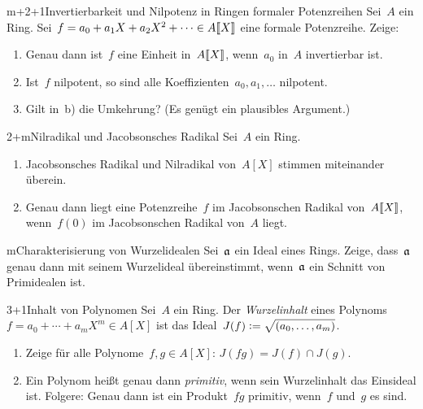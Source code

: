 \documentclass{uebblatt}
\begin{document}

\begin{aufgabe}{m+2+1}{Invertierbarkeit und Nilpotenz in Ringen formaler Potenzreihen}
Sei~$A$ ein Ring. Sei~$f = a_0 + a_1 X + a_2 X^2 + \cdots \in
{A}\llbracket{X}\rrbracket$ eine formale Potenzreihe. Zeige:
\begin{enumerate}
\item Genau dann ist~$f$ eine Einheit in~${A}\llbracket{X}\rrbracket$, wenn~$a_0$ in~$A$ invertierbar
ist.
\item Ist~$f$ nilpotent, so sind alle Koeffizienten~$a_0,a_1,\ldots$ nilpotent.
\item Gilt in~b) die Umkehrung? (Es genügt ein plausibles Argument.)
\end{enumerate}
\end{aufgabe}

\begin{aufgabe}{2+m}{Nilradikal und Jacobsonsches Radikal}
Sei~$A$ ein Ring.
\begin{enumerate}
\item Jacobsonsches Radikal und Nilradikal von~$A[X]$ stimmen miteinander überein.
\item Genau dann liegt eine Potenzreihe~$f$ im Jacobsonschen Radikal
von~${A}\llbracket{X}\rrbracket$, wenn~$f(0)$ im Jacobsonschen Radikal von~$A$ liegt.
\end{enumerate}
\end{aufgabe}

\begin{aufgabe}{m}{Charakterisierung von Wurzelidealen}
Sei~$\mathfrak{a}$ ein Ideal eines Rings. Zeige, dass~$\mathfrak{a}$ genau dann mit
seinem Wurzelideal übereinstimmt, wenn~$\mathfrak{a}$ ein Schnitt von Primidealen ist.
\end{aufgabe}

\begin{aufgabe}{3+1}{Inhalt von Polynomen}
Sei~$A$ ein Ring. Der \emph{Wurzelinhalt} eines Polynoms~$f = a_0 + \cdots +
a_m X^m \in A[X]$ ist das Ideal~$J(f) \vcentcolon= \sqrt{(a_0,\ldots,a_m)}$.
\begin{enumerate}
\item Zeige für alle Polynome~$f, g \in A[X]$: $J(fg) = J(f) \cap J(g)$.
\item Ein Polynom heißt genau dann \emph{primitiv}, wenn sein Wurzelinhalt das
Einsideal ist. Folgere: Genau dann ist ein Produkt~$fg$ primitiv, wenn~$f$
und~$g$ es sind.
\end{enumerate}
\end{aufgabe}
\end{document}
